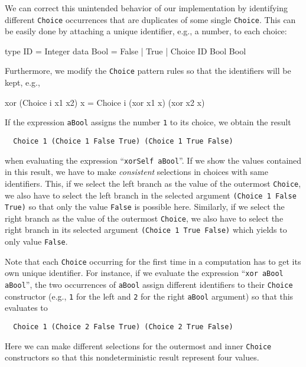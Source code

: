 \documentclass{llncs}
\newcommand{\code}[1]{\mbox{\small\texttt{#1}}}
\newcommand{\ccode}[1]{``\code{#1}''}
\begin{document}
We can correct this unintended behavior of our implementation
by identifying different \code{Choice} occurrences that are duplicates
of some single \code{Choice}. This can be easily done by attaching
a unique identifier, e.g., a number, to each choice:
\begin{haskell}
  type ID = Integer
  data Bool = False | True | Choice ID Bool Bool
\end{haskell}
Furthermore, we modify the \code{Choice} pattern rules so that
the identifiers will be kept, e.g.,
\begin{curry}
  xor (Choice i x1 x2) x = Choice i (xor x1 x) (xor x2 x)
\end{curry}
If the expression \code{aBool} assigns the number \code{1}
to its choice, we obtain the result
\begin{lstlisting}
  Choice 1 (Choice 1 False True) (Choice 1 True False)
\end{lstlisting}
when evaluating the expression \ccode{xorSelf aBool}.
If we show the values contained in this result,
we have to make \emph{consistent} selections in choices with
same identifiers. This, if we select the left branch as the value
of the outermost \code{Choice}, we also have to select the left branch
in the selected argument \code{(Choice 1 False True)} so that only
the value \code{False} is possible here.
Similarly, if we select the right branch as the value of the outermost
\code{Choice}, we also have to select the right branch in
its selected argument \code{(Choice 1 True False)} which yields to only
value \code{False}.

Note that each \code{Choice} occurring for the first time in a computation
has to get its own unique identifier.
For instance, if we evaluate the expression \ccode{xor aBool aBool},
the two occurrences of \code{aBool} assign different identifiers
to their \code{Choice} constructor (e.g., \code{1} for the left
and \code{2} for the right \code{aBool} argument) so that this evaluates to
\begin{lstlisting}
  Choice 1 (Choice 2 False True) (Choice 2 True False)
\end{lstlisting}
Here we can make different selections for the outermost and inner
\code{Choice} constructors so that this nondeterministic result represent
four values.
\end{document}
